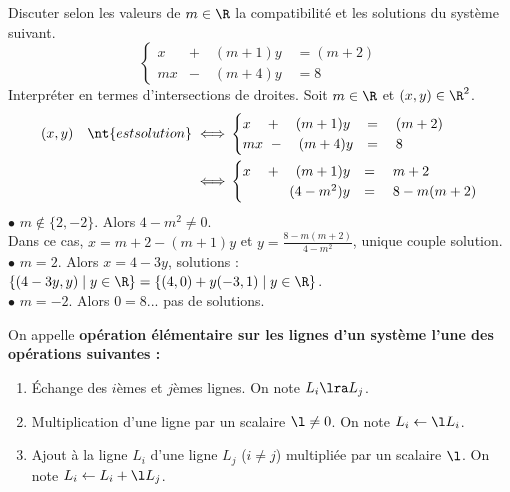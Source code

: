 \documentclass[11pt]{article}
\begin{document}
\begin{ex}{}{}
    Discuter selon les valeurs de $m\in\R$ la compatibilité et les solutions du système suivant.
    \begin{equation*}
        \begin{cases}
            x&+\quad (m+1)y\quad= (m+2)\\
            mx&-\quad (m+4)y\quad= 8
        \end{cases}
    \end{equation*}
    Interpréter en termes d'intersections de droites.
    \tcblower
    Soit $m\in\R$ et $(x,y)\in\R^2$.
    \begin{align*}
        (x,y)\quad\nt{est solution} \iff& \begin{cases}
            x\quad+\quad(m+1)y&=\quad(m+2)\\
            mx~-\quad(m+4)y&=\quad8
        \end{cases}\\
        \iff& \begin{cases}
            x\quad+\quad(m+1)y&=\quad m+2\\
            \qquad~\quad(4-m^2)y&=\quad8-m(m+2)
        \end{cases}
    \end{align*}
    $\bullet$ $m\notin\{2,-2\}$. Alors $4-m^2\neq0$.\\
    Dans ce cas, $x=m+2-(m+1)y$ et $y=\frac{8-m(m+2)}{4-m^2}$, unique couple solution.\\
    $\bullet$ $m=2$. Alors $x=4-3y$, solutions : $\{(4-3y,y)\mid y\in\R\}=\{(4,0)+y(-3,1)\mid y\in\R\}$.\\
    $\bullet$ $m=-2$. Alors $0=8$... pas de solutions.
\end{ex}

\begin{defi}{}{}
    On appelle \bf{opération élémentaire} sur les lignes d'un système l'une des opérations suivantes :
    \begin{enumerate}
        \item Échange des $i$èmes et $j$èmes lignes. On note $L_i\lra L_j$.
        \item Multiplication d'une ligne par un scalaire $\l\neq0$. On note $L_i\gets\l L_i$.
        \item Ajout à la ligne $L_i$ d'une ligne $L_j$ ($i\neq j$) multipliée par un scalaire $\l$. On note $L_i\gets L_i + \l L_j$.
    \end{enumerate}
\end{defi}
\end{document}
